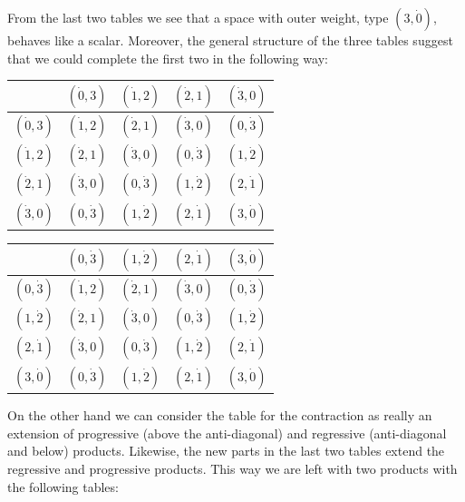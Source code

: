 \documentclass[\ifafour a4paper,12pt,\else a5paper,10pt,\fi%
onecolumn,oneside,article,%
british%
]{memoir}
\theoremstyle{remark}
\theoremstyle{innote}
\renewcommand*{\|}{\nonscript\,\vert\nonscript\;\mathopen{}}
\newcommand*{\ywp}{\dot{0}}
\newcommand*{\ywl}{\dot{1}}
\newcommand*{\ywa}{\dot{2}}
\newcommand*{\ywv}{\dot{3}}
\begin{document}
From the last two tables we see that a space with outer weight, type
$(3,\ywp)$, behaves like a scalar. Moreover, the general structure of the
three tables suggest that we could complete the first two in the following
way:

{\centering
  \begin{tabular}{c|cccc}
    & $(\ywp,3)$&$(\ywl,2)$&$(\ywa,1)$&$(\ywv,0)$ \\
    \midrule
    $(\ywp,3)$&$(\ywl,2)$&$(\ywa,1)$&$(\ywv,0)$&$(0,\ywv)$ \\
    $(\ywl,2)$&$(\ywa,1)$&$(\ywv,0)$&$(0,\ywv)$&$(1,\ywa)$ \\
    $(\ywa,1)$&$(\ywv,0)$&$(0,\ywv)$&$(1,\ywa)$&$(2,\ywl)$ \\
    $(\ywv,0)$&$(0,\ywv)$&$(1,\ywa)$&$(2,\ywl)$&$(3,\ywp)$ \\
  \end{tabular}

}

\bigskip
{\centering
  \begin{tabular}{c|cccc}
    & $(0,\ywv)$&$(1,\ywa)$&$(2,\ywl)$&$(3,\ywp)$ \\
    \midrule
    $(0,\ywv)$&$(\ywl,2)$&$(\ywa,1)$&$(\ywv,0)$&$(0,\ywv)$ \\
    $(1,\ywa)$&$(\ywa,1)$&$(\ywv,0)$&$(0,\ywv)$&$(1,\ywa)$ \\
    $(2,\ywl)$&$(\ywv,0)$&$(0,\ywv)$&$(1,\ywa)$&$(2,\ywl)$ \\
    $(3,\ywp)$&$(0,\ywv)$&$(1,\ywa)$&$(2,\ywl)$&$(3,\ywp)$ \\
  \end{tabular}

}

On the other hand we can consider the table for the contraction as really
an extension of progressive (above the anti-diagonal) and regressive
(anti-diagonal and below) products. Likewise, the new parts in the last two
tables extend the regressive and progressive products. This way we are left
with two products with the following tables:

\bigskip
\end{document}

